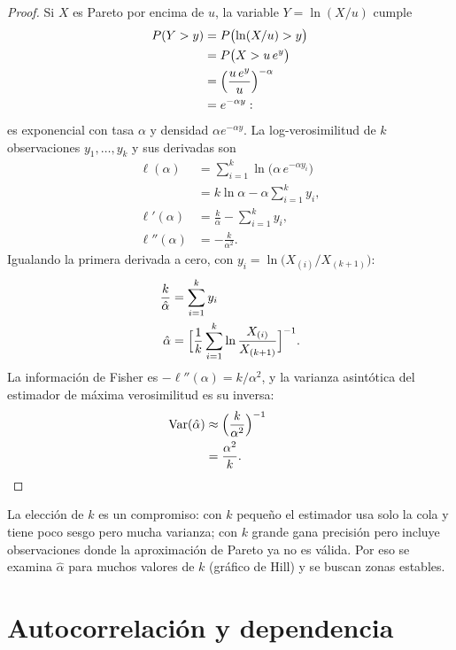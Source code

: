 \begin{proof}
Si $X$ es Pareto por encima de $u$, la variable $Y=\ln(X/u)$ cumple
\begin{align*}
  P(Y>y) &= P\bigl(\ln(X/u)>y\bigr)\\
         &= P\bigl(X>u\,e^{y}\bigr)\\
         &= \Bigl(\frac{u\,e^{y}}{u}\Bigr)^{-\alpha}\\
         &= e^{-\alpha y}:
\end{align*}
es exponencial con tasa $\alpha$ y densidad $\alpha e^{-\alpha y}$. La log-verosimilitud de $k$
observaciones $y_1,\dots,y_k$ y sus derivadas son
\begin{align*}
  \ell(\alpha)   &= \sum_{i=1}^k\ln\bigl(\alpha\,e^{-\alpha y_i}\bigr)\\
                 &= k\ln\alpha-\alpha\sum_{i=1}^ky_i,\\
  \ell'(\alpha)  &= \frac{k}{\alpha}-\sum_{i=1}^ky_i,\\
  \ell''(\alpha) &= -\frac{k}{\alpha^2}.
\end{align*}
Igualando la primera derivada a cero, con $y_i=\ln\bigl(X_{(i)}/X_{(k+1)}\bigr)$:
\begin{align*}
  \frac{k}{\hat\alpha} &= \sum_{i=1}^ky_i\\
  \hat\alpha &= \Bigl[\frac1k\sum_{i=1}^k\ln\frac{X_{(i)}}{X_{(k+1)}}\Bigr]^{-1}.
\end{align*}
La información de Fisher es $-\ell''(\alpha)=k/\alpha^2$, y la varianza asintótica del estimador de máxima
verosimilitud es su inversa:
\begin{align*}
  \operatorname{Var}(\hat\alpha) &\approx \Bigl(\frac{k}{\alpha^2}\Bigr)^{-1}\\
                   &= \frac{\alpha^2}{k}. && \qedhere
\end{align*}
\end{proof}

\begin{observacion}
La elección de $k$ es un compromiso: con $k$ pequeño el estimador usa solo la cola y tiene poco sesgo
pero mucha varianza; con $k$ grande gana precisión pero incluye observaciones donde la aproximación de
Pareto ya no es válida. Por eso se examina $\hat\alpha$ para muchos valores de $k$ (gráfico de Hill) y se
buscan zonas estables.
\end{observacion}

\section{Autocorrelación y dependencia}\label{sec:acf}

